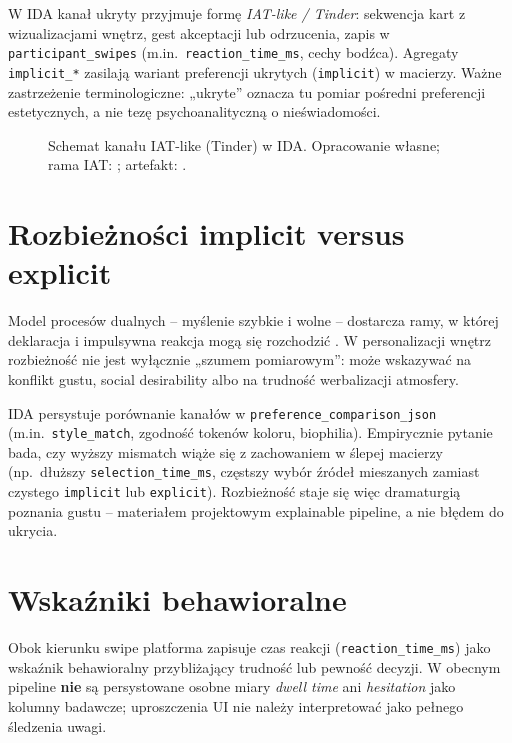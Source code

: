 W IDA kanał ukryty przyjmuje formę \emph{IAT-like / Tinder}: sekwencja kart z wizualizacjami wnętrz, gest akceptacji lub odrzucenia, zapis w \texttt{participant\_swipes} (m.in.\ \texttt{reaction\_time\_ms}, cechy bodźca).
Agregaty \texttt{implicit\_*} zasilają wariant preferencji ukrytych (\texttt{implicit}) w macierzy.
Ważne zastrzeżenie terminologiczne: „ukryte” oznacza tu pomiar pośredni preferencji estetycznych, a nie tezę psychoanalityczną o nieświadomości.

\begin{figure}[htbp]
  \centering
  \caption{Schemat kanału IAT-like (Tinder) w IDA.
    Opracowanie własne; rama IAT: \textcite{greenwald1998iat}; artefakt: \parencite{idaPlatform2026}.}
  \label{fig:ch03:tinder-iat}
\end{figure}

\section{Rozbieżności implicit versus explicit}
\label{ch03:sec:rozbieznosci}

Model procesów dualnych -- myślenie szybkie i wolne -- dostarcza ramy, w której deklaracja i impulsywna reakcja mogą się rozchodzić \parencite{kahneman2011thinking}.
W personalizacji wnętrz rozbieżność nie jest wyłącznie „szumem pomiarowym”: może wskazywać na konflikt gustu, social desirability albo na trudność werbalizacji atmosfery.

IDA persystuje porównanie kanałów w \texttt{preference\_comparison\_json} (m.in.\ \texttt{style\_match}, zgodność tokenów koloru, biophilia).
Empirycznie pytanie~ bada, czy wyższy mismatch wiąże się z zachowaniem w ślepej macierzy (np.\ dłuższy \texttt{selection\_time\_ms}, częstszy wybór źródeł mieszanych zamiast czystego \texttt{implicit} lub \texttt{explicit}).
Rozbieżność staje się więc dramaturgią poznania gustu -- materiałem projektowym explainable pipeline, a nie błędem do ukrycia.

\section{Wskaźniki behawioralne}
\label{ch03:sec:behavioral}

Obok kierunku swipe platforma zapisuje czas reakcji (\texttt{reaction\_time\_ms}) jako wskaźnik behawioralny przybliżający trudność lub pewność decyzji.
W obecnym pipeline \textbf{nie} są persystowane osobne miary \emph{dwell time} ani \emph{hesitation} jako kolumny badawcze; uproszczenia UI nie należy interpretować jako pełnego śledzenia uwagi.

